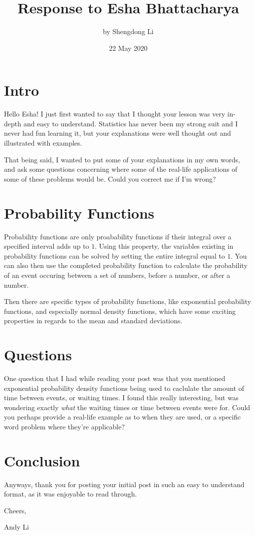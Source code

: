 \documentclass[letterpaper, 12pt]{article}
\begin{document}
\title{Response to Esha Bhattacharya}
\author{by Shengdong Li}
\date{22 May 2020}
\maketitle

\section{Intro}
Hello Esha! I just first wanted to say that I thought your lesson was very in-depth and easy to understand. Statistics has never been my strong suit and I never had fun learning it, but your explanations were well thought out and illustrated with examples. \par
That being said, I wanted to put some of your explanations in my own words, and ask some questions concerning where some of the real-life applications of some of these problems would be. Could you correct me if I'm wrong?
\section{Probability Functions}
Probability functions are only proabability functions if their integral over a specified interval adds up to $1$. Using this property, the variables existing in probability functions can be solved by setting the entire integral equal to $1$. You can also then use the completed probability function to calculate the probability of an event occuring between a set of numbers, before a number, or after a number. \par
Then there are specific types of probability functions, like exponential probability functions, and especially normal density functions, which have some exciting properties in regards to the mean and standard deviations. 
\section{Questions}
One question that I had while reading your post was that you mentioned exponential probability density functions being used to caclulate the amount of time between events, or waiting times. I found this really interesting, but was wondering exactly \textit{what} the waiting times or time between events were for. Could you perhaps provide a real-life example as to when they are used, or a specific word problem where they're applicable?
\section{Conclusion}
Anyways, thank you for posting your initial post in such an easy to understand format, as it was enjoyable to read through. \bigskip \par
Cheers, \par
Andy Li
\end{document}
